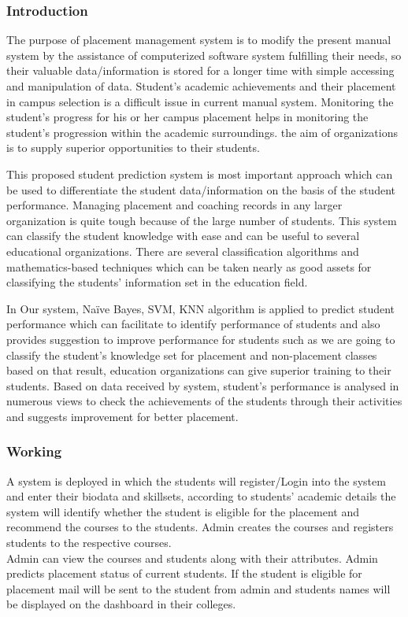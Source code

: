 \documentclass[12pt]{article}
\begin{document}
\subsubsection{Introduction}
The purpose of placement management system is to modify the present 
manual system by the assistance of computerized software 
system fulfilling their needs, so their valuable 
data/information is stored for a longer time with simple 
accessing and manipulation of data. Student’s academic 
achievements and their placement in campus selection is a 
difficult issue in current manual system. Monitoring the 
student’s progress for his or her campus placement helps in 
monitoring the student’s progression within the academic 
surroundings. the aim of organizations is to supply superior 
opportunities to their students. 

This proposed student prediction system is most important approach which can be 
used to differentiate the student data/information on the basis 
of the student performance. Managing placement and 
coaching records in any larger organization is quite tough 
because of the large number of students. This system can 
classify the student knowledge with ease and can be useful to 
several educational organizations. There are several 
classification algorithms and mathematics-based techniques 
which can be taken nearly as good assets for classifying the 
students’ information set in the education field. 

In Our system, Naïve Bayes, SVM, KNN algorithm is applied to predict 
student performance which can facilitate to identify 
performance of students and also provides suggestion to 
improve performance for students such as we are going to 
classify the student's knowledge set for placement and non-placement classes based on that result, education 
organizations can give superior training to their students. 
Based on data received by system, student’s performance is 
analysed in numerous views to check the achievements of the 
students through their activities and suggests improvement for 
better placement.

\newpage
\subsubsection{Working}

A system is deployed in which the 
students will register/Login into the system and enter their 
biodata and skillsets, according to students’ academic details 
the system will identify whether the student is eligible for the 
placement and recommend the courses to the students. Admin 
creates the courses and registers students to the respective 
courses. 
\\
Admin can view the courses and students along with 
their attributes. Admin predicts placement status of current 
students. If the student is eligible for placement mail will be 
sent to the student from admin and students names will be 
displayed on the dashboard in their colleges.
\end{document}
